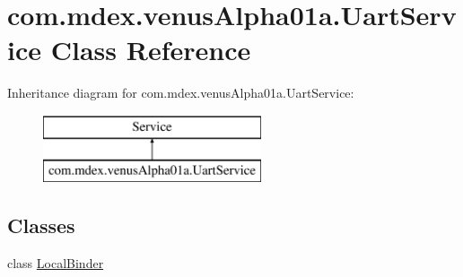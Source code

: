\hypertarget{classcom_1_1mdex_1_1venus_alpha01a_1_1_uart_service}{}\section{com.\+mdex.\+venus\+Alpha01a.\+Uart\+Service Class Reference}
\label{classcom_1_1mdex_1_1venus_alpha01a_1_1_uart_service}
Inheritance diagram for com.\+mdex.\+venus\+Alpha01a.\+Uart\+Service\+:\begin{figure}[H]
\begin{center}
\leavevmode
\includegraphics[height=2.000000cm]{classcom_1_1mdex_1_1venus_alpha01a_1_1_uart_service}
\end{center}
\end{figure}
\subsection*{Classes}
\begin{DoxyCompactItemize}
\item 
class \hyperlink{classcom_1_1mdex_1_1venus_alpha01a_1_1_uart_service_1_1_local_binder}{Local\+Binder}
\end{DoxyCompactItemize}
